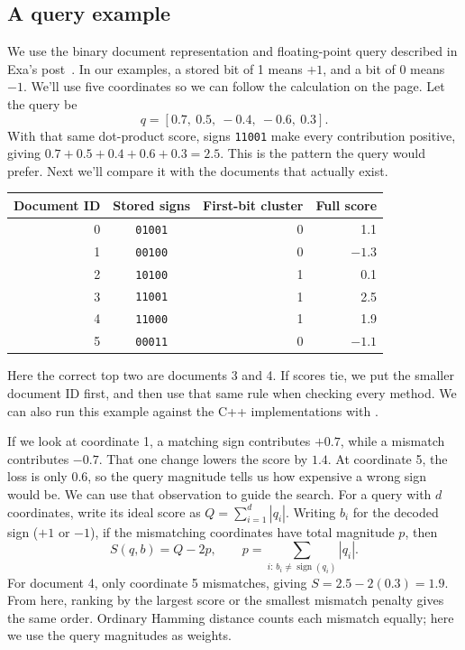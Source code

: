 \subsection{A query example}
We use the binary document representation and floating-point query described in Exa's
post~\cite{exa}. In our examples, a stored bit of 1 means $+1$, and a bit of 0 means $-1$. We'll use five coordinates so we can follow
the calculation on the page. Let the query be
\[
q=[0.7,\ 0.5,\ -0.4,\ -0.6,\ 0.3].
\]
With that same dot-product score, signs \texttt{11001} make every contribution positive, giving
$0.7+0.5+0.4+0.6+0.3=2.5$. This is the pattern the query would prefer. Next we'll compare it
with the documents that actually exist.

\begin{center}
\begin{tabular}{@{}rcrr@{}}\toprule
Document ID & Stored signs & First-bit cluster & Full score\\\midrule
0 & \texttt{01001} & 0 & 1.1\\
1 & \texttt{00100} & 0 & $-1.3$\\
2 & \texttt{10100} & 1 & 0.1\\
3 & \texttt{11001} & 1 & 2.5\\
4 & \texttt{11000} & 1 & 1.9\\
5 & \texttt{00011} & 0 & $-1.1$\\\bottomrule
\end{tabular}
\end{center}
Here the correct top two are documents 3 and 4. If scores tie, we put the smaller document ID
first, and then use that same rule when checking every method. We can also run this example
against the C++ implementations with .

If we look at coordinate 1, a matching sign contributes $+0.7$, while a mismatch contributes
$-0.7$. That one change lowers the score by $1.4$. At coordinate 5, the loss is only $0.6$,
so the query magnitude tells us how expensive a wrong sign would be. We can use that observation
to guide the search. For a query with $d$ coordinates, write its ideal score as
$Q=\sum_{i=1}^{d}|q_i|$. Writing $b_i$ for the decoded sign ($+1$ or $-1$), if the mismatching
coordinates have total magnitude $p$, then
\begin{equation}
S(q,b)=Q-2p,
\qquad p=\sum_{i:\,b_i\ne\operatorname{sign}(q_i)}|q_i|.
\label{eq:score}
\end{equation}
For document 4, only coordinate 5 mismatches, giving $S=2.5-2(0.3)=1.9$. From here, ranking
by the largest score or the smallest mismatch penalty gives the same order. Ordinary Hamming
distance counts each mismatch equally; here we use the query magnitudes as weights.

